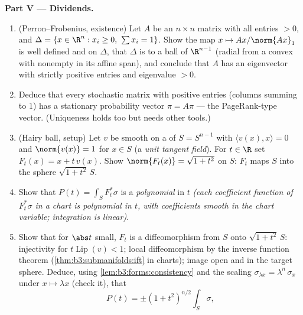 \begin{problem}
\medskip
\noindent\textbf{Part V --- Dividends.}
\begin{enumerate}[resume]
  \item (Perron--Frobenius, existence) Let $A$ be an
        $n\times n$ matrix with all entries $> 0$, and
        $\Delta = \{x \in \R^n : x_i \geq 0,\ \sum x_i =
        1\}$. Show the map $x \mapsto Ax/\norm{Ax}_1$ is
        well defined and  on $\Delta$, that
        $\Delta$ is  to a  ball of
        $\R^{n-1}$ (radial  from a convex
         with nonempty  in its affine span),
        and conclude that $A$ has an eigenvector with
        strictly positive entries and eigenvalue $> 0$.
  \item Deduce that every stochastic matrix with positive
        entries (columns summing to $1$) has a stationary
        probability vector $\pi = A\pi$ --- the
        PageRank-type vector. (Uniqueness holds too but
        needs other tools.)
  \item (Hairy ball, setup) Let $v$ be smooth on a
         of $S = S^{n-1}$ with $\langle v(x),
        x\rangle = 0$ and $\norm{v(x)} = 1$ for $x \in S$
        (a \emph{unit tangent field}). For $t \in \R$ set
        $F_t(x) = x + t\,v(x)$. Show
        $\norm{F_t(x)} = \sqrt{1 + t^2}$ on $S$: $F_t$ maps
        $S$ into the sphere $\sqrt{1+t^2}\,S$.
  \item Show that $P(t) = \int_SF_t^*\sigma$ is a
        \emph{polynomial} in $t$ \emph{(each coefficient
        function of $F_t^*\sigma$ in a chart is polynomial
        in $t$, with coefficients smooth in the chart
        variable; integration is linear)}.
  \item Show that for $\abs t$ small, $F_t$ is a
        diffeomorphism from $S$ onto $\sqrt{1+t^2}\,S$:
        injectivity for $t\operatorname{Lip}(v) < 1$; local
        diffeomorphism by the inverse function theorem
        (\cref{thm:b3:submanifolds:ift} in charts); image
        open and  in the  target sphere.
        Deduce, using \cref{lem:b3:forms:consistency} and
        the scaling $\sigma_{\lambda x} =
        \lambda^{n}\,\sigma_x$ under $x \mapsto \lambda x$
        (check it), that
        \[
        P(t) = \pm(1 + t^2)^{n/2}\int_S\sigma,
\]
\end{enumerate}
\end{problem}
